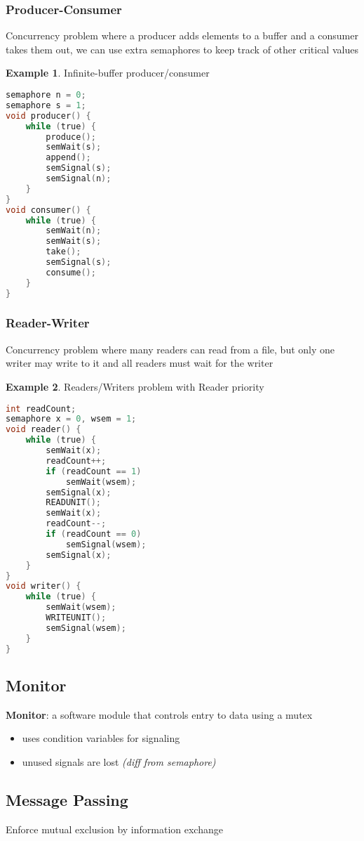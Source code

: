 \documentclass[]{article}
\theoremstyle{definition}
\newtheorem{ex}{Example}[section]
\begin{document}
			\subsubsection{Producer-Consumer}
				Concurrency problem where a producer adds elements to a buffer and a consumer takes them out, we can use extra semaphores to keep track of other critical values
				\begin{ex}
					Infinite-buffer producer/consumer
					\begin{lstlisting}[language=C]
semaphore n = 0;
semaphore s = 1;
void producer() {
	while (true) {
		produce();
		semWait(s);
		append();
		semSignal(s);
		semSignal(n);
	}
}
void consumer() {
	while (true) {
		semWait(n);
		semWait(s);
		take();
		semSignal(s);
		consume();
	}
}
					\end{lstlisting}
				\end{ex}
			\subsubsection{Reader-Writer}
				Concurrency problem where many readers can read from a file, but only one writer may write to it and all readers must wait for the writer
				\begin{ex}
					Readers/Writers problem with Reader priority
					\begin{lstlisting}[language=C]
int readCount;
semaphore x = 0, wsem = 1;
void reader() {
	while (true) {
		semWait(x);
		readCount++;
		if (readCount == 1)
			semWait(wsem);
		semSignal(x);
		READUNIT();
		semWait(x);
		readCount--;
		if (readCount == 0)
			semSignal(wsem);
		semSignal(x);
	}
}
void writer() {
	while (true) {
		semWait(wsem);
		WRITEUNIT();
		semSignal(wsem);
	}
}
					\end{lstlisting}
				\end{ex}
			\subsection{Monitor}
				\textbf{Monitor}: a software module that controls entry to data using a mutex
				\begin{itemize}
					\item uses condition variables for signaling
					\item unused signals are lost \textit{(diff from semaphore)}
				\end{itemize}
			\subsection{Message Passing}
				Enforce mutual exclusion by information exchange
\end{document}
